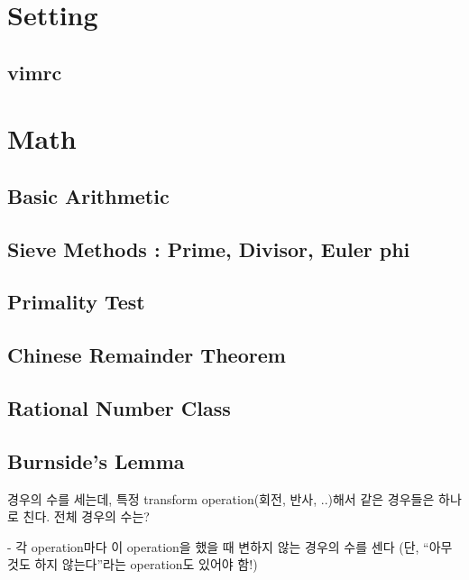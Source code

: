 \documentclass[10pt,landscape,a4paper,twocolumn]{article}
\begin{document}
\tableofcontents


\section{Setting}

\subsection{vimrc}



\section{Math}

\subsection{Basic Arithmetic}


\subsection{Sieve Methods : Prime, Divisor, Euler phi}


\subsection{Primality Test}


\subsection{Chinese Remainder Theorem}


\subsection{Rational Number Class}


\subsection{Burnside's Lemma}

경우의 수를 세는데, 특정 transform operation(회전, 반사, ..)해서 같은 경우들은 하나로 친다.
전체 경우의 수는?

- 각 operation마다 이 operation을 했을 때 변하지 않는 경우의 수를 센다
(단, ``아무것도 하지 않는다''라는 operation도 있어야 함!)
\end{document}

